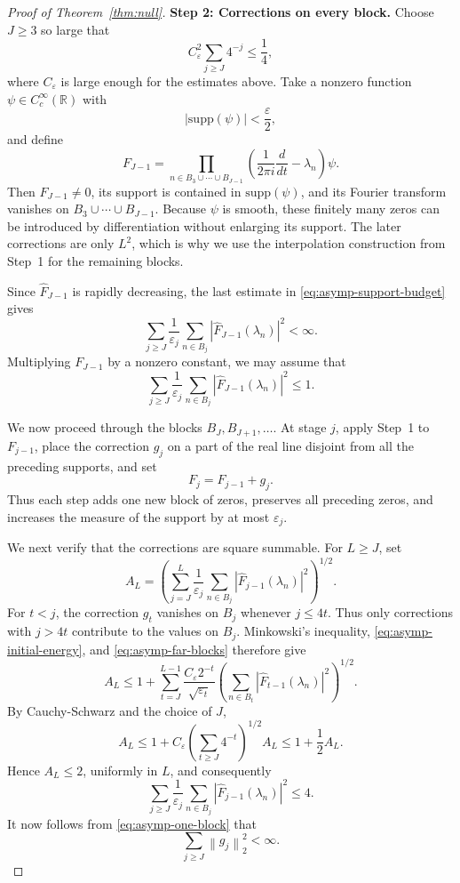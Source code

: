 \documentclass[10pt,a4paper]{amsart}
\def\R{{\mathbb R}}
\newcommand{\norm}[1]{\left\lVert #1 \right\rVert}
\newcommand{\supp}{{\mathrm{supp}}}
\begin{document}
\begin{proof}[Proof of Theorem~\ref{thm:null}]
\noindent\textbf{Step 2: Corrections on every block.}
Choose \(J\geq3\) so large that
\[
    C_\varepsilon^2\sum_{j\geq J}4^{-j}\leq\frac14,
\]
where \(C_\varepsilon\) is large enough for the estimates above. Take
a nonzero function \(\psi\in C_c^\infty(\R)\) with
\[
    |\supp(\psi)|<\frac{\varepsilon}{2},
\]
and define
\[
    F_{J-1}
    =
    \prod_{n\in B_3\cup\cdots\cup B_{J-1}}
    \left(\frac1{2\pi i}\frac{d}{dt}-\lambda_n\right)\psi.
\]
Then \(F_{J-1}\neq0\), its support is contained in \(\supp(\psi)\), and
its Fourier transform vanishes on
\(B_3\cup\cdots\cup B_{J-1}\). Because \(\psi\) is smooth, these
finitely many zeros can be introduced by differentiation without
enlarging its support. The later corrections are only \(L^2\), which
is why we use the interpolation construction from Step~1 for the
remaining blocks.

Since \(\widehat F_{J-1}\) is rapidly decreasing, the last estimate in
\eqref{eq:asymp-support-budget} gives
\[
    \sum_{j\geq J}\frac1{\varepsilon_j}
    \sum_{n\in B_j}
    |\widehat F_{J-1}(\lambda_n)|^2<\infty.
\]
Multiplying \(F_{J-1}\) by a nonzero constant, we may assume that
\begin{equation}\label{eq:asymp-initial-energy}
    \sum_{j\geq J}\frac1{\varepsilon_j}
    \sum_{n\in B_j}
    |\widehat F_{J-1}(\lambda_n)|^2\leq1.
\end{equation}

We now proceed through the blocks \(B_J,B_{J+1},\ldots\). At stage
\(j\), apply Step~1 to \(F_{j-1}\), place the correction \(g_j\) on a
part of the real line disjoint from all the preceding supports, and set
\[
    F_j=F_{j-1}+g_j.
\]
Thus each step adds one new block of zeros, preserves all preceding
zeros, and increases the measure of the support by at most
\(\varepsilon_j\).

We next verify that the corrections are square summable. For \(L\geq J\),
set
\[
    A_L=
    \left(
        \sum_{j=J}^{L}\frac1{\varepsilon_j}
        \sum_{n\in B_j}
        |\widehat F_{j-1}(\lambda_n)|^2
    \right)^{1/2}.
\]
For \(t<j\), the correction \(g_t\) vanishes on \(B_j\) whenever
\(j\leq4t\). Thus only corrections with \(j>4t\) contribute to the
values on \(B_j\). Minkowski's inequality,
\eqref{eq:asymp-initial-energy}, and
\eqref{eq:asymp-far-blocks} therefore give
\[
    A_L
    \leq
    1+
    \sum_{t=J}^{L-1}
    \frac{C_\varepsilon2^{-t}}{\sqrt{\varepsilon_t}}
    \left(
        \sum_{n\in B_t}
        |\widehat F_{t-1}(\lambda_n)|^2
    \right)^{1/2}.
\]
By Cauchy-Schwarz and the choice of \(J\),
\[
    A_L
    \leq
    1+
    C_\varepsilon
    \left(\sum_{t\geq J}4^{-t}\right)^{1/2}A_L
    \leq1+\frac12A_L.
\]
Hence \(A_L\leq2\), uniformly in \(L\), and consequently
\[
    \sum_{j\geq J}\frac1{\varepsilon_j}
    \sum_{n\in B_j}
    |\widehat F_{j-1}(\lambda_n)|^2
    \leq4.
\]
It now follows from \eqref{eq:asymp-one-block} that
\[
    \sum_{j\geq J}\norm{g_j}_2^2<\infty.
\]


\end{proof}
\end{document}
